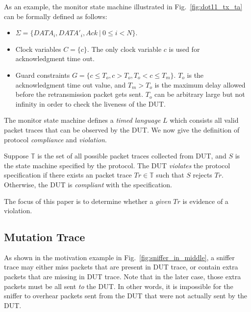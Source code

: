 As an example, the monitor state machine illustrated in
Fig.~\ref{fig:dot11_tx_ta} can be formally defined as follows:

\begin{itemize}
  \item $\Sigma = \{DATA_i, DATA'_i, Ack\ |\ 0 \le i < N\}$.
  \item Clock variables $C = \{c\}$. The only clock variable $c$ is
    used for acknowledgment time out.
  \item Guard constraints $G = \{ c \le T_o, c > T_o, T_o < c \le T_m\}$.
    $T_o$ is the acknowledgment time out value, and $T_m >
    T_o$ is the maximum delay allowed before the retransmission packet gets
    sent. $T_o$ can be arbitrary large but not infinity in order to check the
    liveness of the DUT.
\end{itemize}


The monitor state machine defines a \textit{timed language} $L$ which consists
all valid packet traces that can be observed by the DUT.  We now give the
definition of protocol \textit{compliance} and \textit{violation}.

\begin{definition}
  Suppose $\mathbb{T}$ is the set of all possible packet traces collected from
  DUT, and $S$ is the state machine specified by the protocol. The DUT
  \textit{violates} the protocol specification if there exists an
  packet trace $Tr \in \mathbb{T}$ such that $S$ rejects $Tr$.
  Otherwise, the DUT is \textit{compliant} with the specification.
\end{definition}

The focus of this paper is to determine whether a \textit{given} $Tr$ is
evidence of a violation.
%


\subsection{Mutation Trace}
\label{subsec:mutation}

As shown in the motivation example in Fig.~\ref{fig:sniffer_in_middle}, a
sniffer trace may either miss packets that are present in DUT trace, or contain
extra packets that are missing in DUT trace. Note that in the later case, those
extra packets must be all sent \textit{to} the DUT. In other words, it is
impossible for the sniffer to overhear packets sent from the DUT that were not
actually sent by the DUT.

